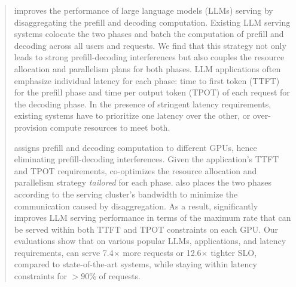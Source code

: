 \begin{abstract}
\sys improves the performance of large language models (LLMs) serving by disaggregating the prefill and decoding computation. Existing LLM serving systems colocate the two phases and batch the computation of prefill and decoding across all users and requests. 
We find that this strategy not only leads to strong prefill-decoding interferences but also couples the resource allocation and parallelism plans for both phases. LLM applications often emphasize individual latency for each phase: time to first token (TTFT) for the prefill phase and time per output token (TPOT) of each request for the decoding phase.
In the presence of stringent latency requirements, existing systems have to prioritize one latency over the other, or over-provision compute resources to meet both. 

\sys assigns prefill and decoding computation to different GPUs, hence eliminating prefill-decoding interferences. Given the application's TTFT and TPOT requirements, \sys co-optimizes the resource allocation and parallelism strategy \emph{tailored} for each phase. \sys also places the two phases according to the serving cluster's bandwidth to minimize the communication caused by disaggregation. As a result, \sys significantly improves LLM serving performance in terms of the maximum rate that can be served within both TTFT and TPOT constraints on each GPU.
Our evaluations show that on various popular LLMs, applications, and latency requirements, \sys can serve 7.4$\times$ more requests or 12.6$\times$ tighter SLO, compared to state-of-the-art systems, while staying within latency constraints for $>90\%$ of requests.
    
\end{abstract}